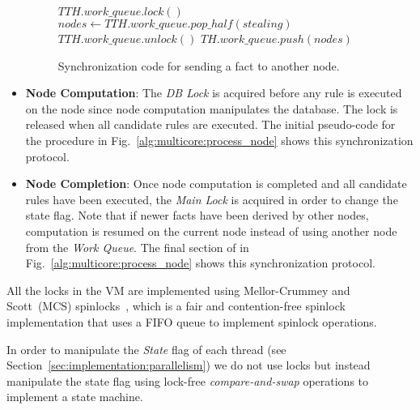 \begin{itemize}
\begin{figure}
\begin{algorithm}[H]
   $TTH.work\_queue.lock()$\;
   $nodes \longleftarrow TTH.work\_queue.pop\_half(stealing)$\;
   $TTH.work\_queue.unlock()$\;
   $TH.work\_queue.push(nodes)$\;
\end{algorithm}
\caption{Synchronization code for sending a fact to another node.}
 \label{alg:multicore:steal_nodes}
\end{figure}

   \item \textbf{Node Computation}: The \emph{DB Lock} is acquired before any
      rule is executed on the node since node computation manipulates the
      database. The lock is released when all candidate rules are executed. The
      initial pseudo-code for the  procedure in
      Fig.~\ref{alg:multicore:process_node} shows this synchronization protocol.

   \item \textbf{Node Completion}: Once node computation is completed and all
      candidate rules have been executed, the \emph{Main Lock} is acquired in
      order to change the state flag. Note that if newer facts have been derived
      by other nodes, computation is resumed on the current node instead of
      using another node from the \emph{Work Queue}. The final section of
       in Fig.~\ref{alg:multicore:process_node} shows this
      synchronization protocol.

\end{itemize}

All the locks in the VM are implemented using Mellor-Crummey and Scott~(MCS)
spinlocks~\cite{Mellor-Crummey:1991}, which is a fair and contention-free
spinlock implementation that uses a FIFO queue to implement spinlock operations.

In order to manipulate the \emph{State} flag of each thread (see
Section~\ref{sec:implementation:parallelism}) we do not use locks but instead
manipulate the state flag using lock-free \emph{compare-and-swap} operations to
implement a state machine.

